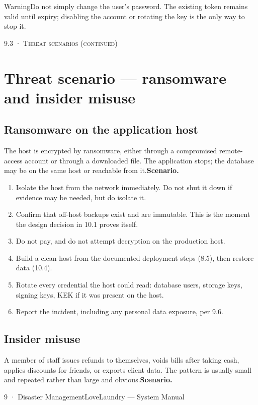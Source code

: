 \documentclass[11pt,a4paper,oneside]{book}
\begin{document}
\begin{notebox}WarningDo not simply change the user's password. The existing token remains valid until expiry; disabling the account or rotating the key is the only way to stop it.\end{notebox}
\textsc{\small\color{crimson}9.3 · Threat scenarios (continued)}\par\medskip
\section*{Threat scenario — ransomware and insider misuse}
\subsection*{Ransomware on the application host}
The host is encrypted by ransomware, either through a compromised remote-access account or through a downloaded file. The application stops; the database may be on the same host or reachable from it.\textbf{Scenario.}

\begin{enumerate}
\item Isolate the host from the network immediately. Do not shut it down if evidence may be needed, but do isolate it.
\item Confirm that off-host backups exist and are immutable. This is the moment the design decision in 10.1 proves itself.
\item Do not pay, and do not attempt decryption on the production host.
\item Build a clean host from the documented deployment steps (8.5), then restore data (10.4).
\item Rotate every credential the host could read: database users, storage keys, signing keys, KEK if it was present on the host.
\item Report the incident, including any personal data exposure, per 9.6.
\end{enumerate}
\subsection*{Insider misuse}
A member of staff issues refunds to themselves, voids bills after taking cash, applies discounts for friends, or exports client data. The pattern is usually small and repeated rather than large and obvious.\textbf{Scenario.}

9 · Disaster ManagementLoveLaundry — System Manual
\end{document}
